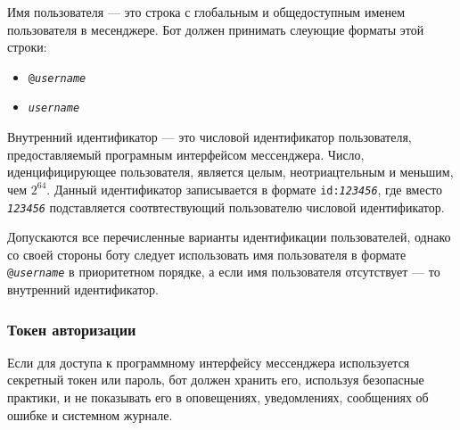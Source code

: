     Имя пользователя --- это строка с глобальным и общедоступным именем пользователя в месенджере.
    Бот должен принимать слеующие форматы этой строки:
    \begin{itemize}
        \item
            \texttt{@\textit{username}}
        \item
            \texttt{\textit{username}}
    \end{itemize}
    
    Внутренний идентификатор --- это числовой идентификатор пользователя, предоставляемый
    програмным интерфейсом мессенджера. Число, иденцифицирующее пользователя, является целым,
    неотриацтельным и меньшим, чем \(2^{64}\). Данный идентификатор записывается в формате
    \texttt{id:\textit{123456}}, где вместо \texttt{\textit{123456}} подставляется соотвтествующий
    пользователю числовой идентификатор.

    Допускаются все перечисленные варианты идентификации пользователей, однако со своей стороны боту
    следует использовать имя пользователя в формате \texttt{@\textit{username}} в приоритетном порядке,
    а если имя пользователя отсутствует --- то внутренний идентификатор.

\subsubsection{Токен авторизации}
    \label{sec:req:sec:token}
    Если для доступа к программному интерфейсу мессенджера используется секретный токен или пароль,
    бот должен хранить его, используя безопасные практики, и не показывать его в оповещениях, уведомлениях,
    сообщениях об ошибке и системном журнале.
